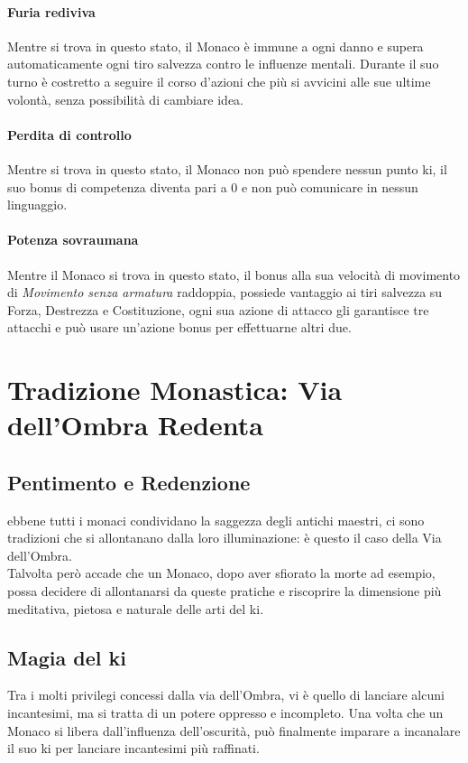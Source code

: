 \paragraph{Furia rediviva} Mentre si trova in questo stato, il Monaco è immune a ogni danno e supera automaticamente ogni tiro salvezza contro le influenze mentali. Durante il suo turno è costretto a seguire il corso d'azioni che più si avvicini alle sue ultime volontà, senza possibilità di cambiare idea.
\paragraph{Perdita di controllo} Mentre si trova in questo stato, il Monaco non può spendere nessun punto ki, il suo bonus di competenza diventa pari a 0 e non può comunicare in nessun linguaggio.
\paragraph{Potenza sovraumana} Mentre il Monaco si trova in questo stato, il bonus alla sua velocità di movimento di \textit{Movimento senza armatura} raddoppia, possiede vantaggio ai tiri salvezza su Forza, Destrezza e Costituzione, ogni sua azione di attacco gli garantisce tre attacchi e può usare un'azione bonus per effettuarne altri due.

\section{Tradizione Monastica: Via dell'Ombra Redenta}

\subsection{Pentimento e Redenzione}

ebbene tutti i monaci condividano la saggezza degli antichi maestri, ci sono tradizioni che si allontanano dalla loro illuminazione: è questo il caso della Via dell'Ombra. \\ Talvolta però accade che un Monaco, dopo aver sfiorato la morte ad esempio, possa decidere di allontanarsi da queste pratiche e riscoprire la dimensione più meditativa, pietosa e naturale delle arti del ki.

\subsection{Magia del ki}

Tra i molti privilegi concessi dalla via dell'Ombra, vi è quello di lanciare alcuni incantesimi, ma si tratta di un potere oppresso e incompleto. Una volta che un Monaco si libera dall'influenza dell'oscurità, può finalmente imparare a incanalare il suo ki per lanciare incantesimi più raffinati.

